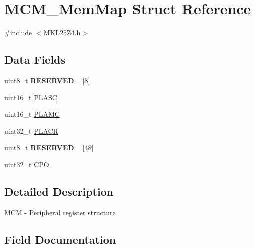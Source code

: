 \hypertarget{struct_m_c_m___mem_map}{}\section{M\+C\+M\+\_\+\+Mem\+Map Struct Reference}
\label{struct_m_c_m___mem_map}


{\ttfamily \#include $<$M\+K\+L25\+Z4.\+h$>$}

\subsection*{Data Fields}
\begin{DoxyCompactItemize}
\item 
\mbox{\label{struct_m_c_m___mem_map_aa03546833695c701bce946849c4acf8b}} 
uint8\+\_\+t {\bfseries R\+E\+S\+E\+R\+V\+E\+D\+\_} \mbox{[}8\mbox{]}
\item 
uint16\+\_\+t \hyperlink{struct_m_c_m___mem_map_ad68f64d82524bb0b181a837967b8e248}{P\+L\+A\+SC}
\item 
uint16\+\_\+t \hyperlink{struct_m_c_m___mem_map_a7d749b910777a6b67ea94f2379c628ee}{P\+L\+A\+MC}
\item 
uint32\+\_\+t \hyperlink{struct_m_c_m___mem_map_a520575ffc4561724479404679213900b}{P\+L\+A\+CR}
\item 
\mbox{\label{struct_m_c_m___mem_map_a11d8df331970d7ffaf79e23b95c82b89}} 
uint8\+\_\+t {\bfseries R\+E\+S\+E\+R\+V\+E\+D\+\_} \mbox{[}48\mbox{]}
\item 
uint32\+\_\+t \hyperlink{struct_m_c_m___mem_map_a887b6813ace7322a6dd2af1f71d7e6c6}{C\+PO}
\end{DoxyCompactItemize}


\subsection{Detailed Description}
M\+CM -\/ Peripheral register structure 

\subsection{Field Documentation}
\mbox{\label{struct_m_c_m___mem_map_a887b6813ace7322a6dd2af1f71d7e6c6}} 
